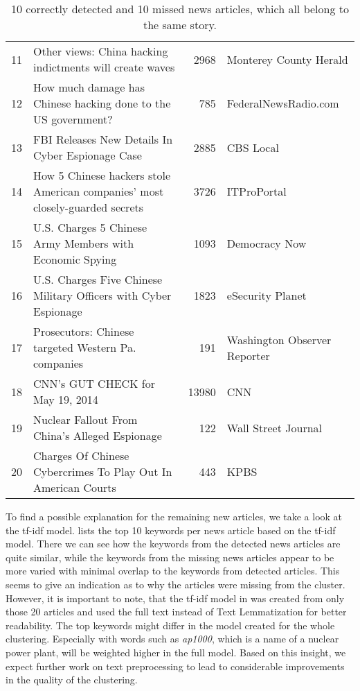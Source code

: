 \begin{table}[h]
{\begin{tabular}{rlrl}
            \hline
                11 & Other views: China hacking indictments will create waves                     &          2968 & Monterey County Herald       \\
                12 & How much damage has Chinese hacking done to the US government?               &           785 & FederalNewsRadio.com         \\
                13 & FBI Releases New Details In Cyber Espionage Case                             &          2885 & CBS Local                    \\
                14 & How 5 Chinese hackers stole American companies' most closely-guarded secrets &          3726 & ITProPortal                  \\
                15 & U.S. Charges 5 Chinese Army Members with Economic Spying                     &          1093 & Democracy Now                \\
                16 & U.S. Charges Five Chinese Military Officers with Cyber Espionage             &          1823 & eSecurity Planet             \\
                17 & Prosecutors: Chinese targeted Western Pa. companies                          &           191 & Washington Observer Reporter \\
                18 & CNN's GUT CHECK for May 19, 2014                                             &         13980 & CNN                  \\
                19 & Nuclear Fallout From China's Alleged Espionage                               &           122 & Wall Street Journal \\
                20 & Charges Of Chinese Cybercrimes To Play Out In American Courts                &           443 & KPBS               \\
                \hline
        \end{tabular}
    }
    \caption{10 correctly detected and 10 missed news articles, which all belong to the same story.}
    \label{tab:clustering_example}
\end{table}

To find a possible explanation for the remaining new articles, we take a look at the tf-idf model.
 lists the top 10 keywords per news article based on the tf-idf model.
There we can see how the keywords from the detected news articles are quite similar,
while the keywords from the missing news articles appear to be more varied
with minimal overlap to the keywords from detected articles.
This seems to give an indication as to why the articles were missing from the cluster.
However, it is important to note, that the tf-idf model in 
was created from only those 20 articles and used the full text instead of Text Lemmatization for better readability.
The top keywords might differ in the model created for the whole clustering.
Especially with words such as \textit{ap1000}, which is a name of a nuclear power plant,
will be weighted higher in the full model.
Based on this insight, we expect further work on text preprocessing
to lead to considerable improvements in the quality of the clustering.

